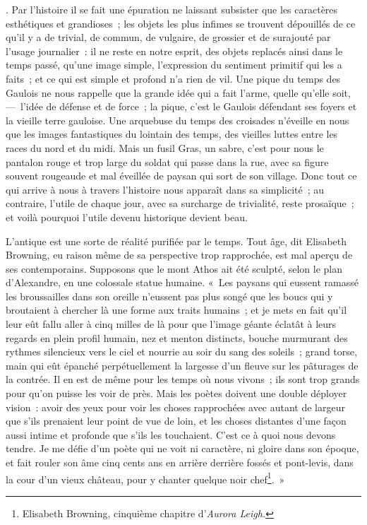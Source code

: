 \documentclass[french,twoside]{book} %
\begin{document}
{}. Par l’histoire il se fait une épuration ne laissant subsister que les caractères esthétiques et grandioses ; les objets les plus infimes se trouvent dépouillés de ce qu’il y a de trivial, de commun, de vulgaire, de grossier et de surajouté par l’usage journalier : il ne reste en notre esprit, des objets replacés ainsi dans le temps passé, qu’une image simple, l’expression du sentiment primitif qui les a faits ; et ce qui est simple et profond n’a rien de vil. Une pique du temps des Gaulois ne nous rappelle que la grande idée qui a fait l’arme, quelle qu’elle soit, — l’idée de défense et de force ; la pique, c’est le Gaulois défendant ses foyers et la vieille terre gauloise. Une arquebuse du temps des croisades n’éveille en nous que les images fantastiques du lointain des temps, des vieilles luttes entre les races du nord et du midi. Mais un fusil Gras, un sabre, c’est pour nous le pantalon rouge et trop large du soldat qui passe dans la rue, avec sa figure souvent rougeaude et mal éveillée de paysan qui sort de son village. Donc tout ce qui arrive à nous à travers l’histoire nous apparaît dans sa simplicité ; au contraire, l’utile de chaque jour, avec sa surcharge de trivialité, reste prosaïque ; et voilà pourquoi l’utile devenu historique devient beau.\par
L’antique est une sorte de réalité purifiée par le temps. Tout âge, dit Elisabeth Browning, eu raison même de sa perspective trop rapprochée, est mal aperçu de ses contemporains. Supposons que le mont Athos ait été sculpté, selon le plan d’Alexandre, en une colossale statue humaine. « Les paysans qui eussent ramassé les broussailles dans son oreille n’eussent pas plus songé que les boucs qui y broutaient à chercher là une forme aux traits humains ; et je mets en fait qu’il leur eût fallu aller à cinq milles de là pour que l’image géante éclatât à leurs regards en plein profil humain, nez et menton distincts, bouche murmurant des rythmes silencieux vers le ciel et nourrie au soir du sang des soleils ; grand torse, main qui eût épanché perpétuellement la largesse d’un fleuve sur les pâturages de la contrée. Il en est de même pour les temps où nous vivons ; ils sont trop grands pour qu’on puisse les voir de près. Mais les poètes doivent une double déployer vision : avoir des yeux pour voir les choses rapprochées avec autant de largeur que s’ils prenaient leur point de vue de loin, et les choses distantes d’une façon aussi intime et profonde que s’ils les touchaient. C’est ce à quoi nous devons tendre. Je me défie d’un poète qui ne voit ni caractère, ni gloire dans son époque, et fait rouler son âme cinq cents ans en arrière derrière fossés et pont-levis, dans la cour d’un vieux château, pour y chanter quelque noir chef\footnote{ Elisabeth Browning, cinquième chapitre d’\emph{Aurora Leigh.}}. »
\end{document}
